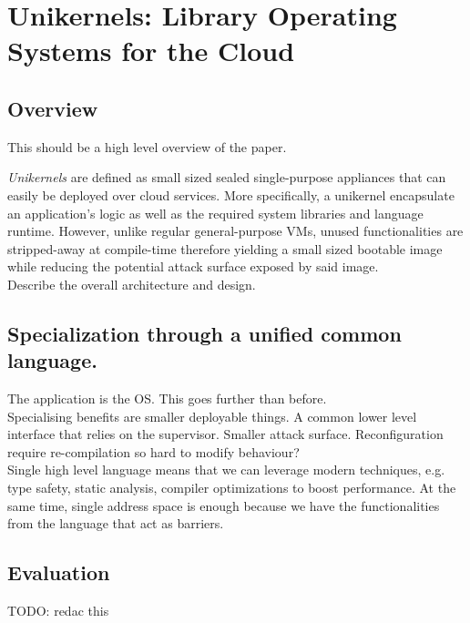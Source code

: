 \section{Unikernels: Library Operating Systems for the Cloud}

\subsection{Overview}
This should be a high level overview of the paper.

\textit{Unikernels} are defined as small sized sealed single-purpose appliances that can easily be deployed over cloud services.
More specifically, a unikernel encapsulate an application's logic as well as the required system libraries and language runtime.
However, unlike regular general-purpose VMs, unused functionalities are stripped-away at compile-time therefore yielding a small sized bootable image while reducing the potential attack surface exposed by said image.\\

Describe the overall architecture and design.\\

\subsection{Specialization through a unified common language.}
The application is the OS.
This goes further than before.\\

Specialising benefits are smaller deployable things.
A common lower level interface that relies on the supervisor.
Smaller attack surface.
Reconfiguration require re-compilation so hard to modify behaviour?\\

Single high level language means that we can leverage modern techniques, e.g. type safety, static analysis, compiler optimizations to boost performance.
At the same time, single address space is enough because we have the functionalities from the language that act as barriers.

\subsection{Evaluation}
TODO: redac this\\

